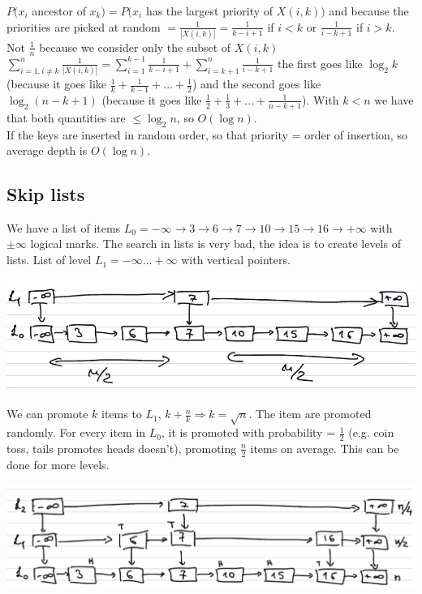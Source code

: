 \documentclass[10pt]{report}
\begin{document}
$P(x_i$ ancestor of $x_k) = P(x_i$ has the largest priority of $X(i,k))$ and because the priorities are picked at random $= \frac{1}{|X(i,k)|} = \frac{1}{k - i + 1}$ if $i < k$ or $\frac{1}{i - k + 1}$ if $i > k$. Not $\frac{1}{n}$ because we consider only the subset of $X(i,k)$\\
$\sum_{i=1, i\neq k}^n \frac{1}{|X(i,k)|} = \sum_{i = 1}^{k-1} \frac{1}{k-i + 1} + \sum_{i = k+1}^n \frac{1}{i - k + 1}$ the first goes like $\log_2 k$ (because it goes like $\frac{1}{k} + \frac{1}{k-1} + \ldots + \frac{1}{2}$) and the second goes like $\log_2 (n - k + 1)$ (because it goes like $\frac{1}{2} + \frac{1}{3} + \ldots + \frac{1}{n-k+1}$). With $k < n$ we have that both quantities are $\leq \log_2 n$, so $O(\log n)$.\\
If the keys are inserted in random order, so that priority = order of insertion, so average depth is $O(\log n)$.
\subsection{Skip lists} We have a list of items $L_0 = -\infty \rightarrow 3 \rightarrow 6 \rightarrow 7 \rightarrow 10 \rightarrow 15 \rightarrow 16 \rightarrow +\infty$ with $\pm\infty$ logical marks. The search in lists is very bad, the idea is to create levels of lists. List of level $L_1 = -\infty \ldots +\infty$ with vertical pointers.
\begin{center}
	\includegraphics[scale=0.5]{5.png}
\end{center}
We can promote $k$ items to $L_1$, $k + \frac{n}{k} \Rightarrow k = \sqrt{n}$. The item are promoted randomly. For every item in $L_0$, it is promoted with probability = $\frac{1}{2}$ (e.g. coin toss, tails promotes heads doesn't), promoting $\frac{n}{2}$ items on average. This can be done for more levels.
\begin{center}
	\includegraphics[scale=0.5]{6.png}
\end{center}
\end{document}
